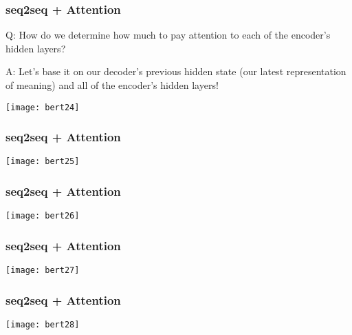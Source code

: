 \begin{frame}[fragile]\frametitle{seq2seq + Attention}

Q: How do we determine how much to pay attention to each of the encoder’s hidden layers? 

A: Let’s base it on our decoder’s previous hidden state (our latest representation of meaning) and all of the encoder’s hidden layers!



\begin{center}
\texttt{[image: bert24]}
\end{center}	

\end{frame}

\begin{frame}[fragile]\frametitle{seq2seq + Attention}

\begin{center}
\texttt{[image: bert25]}
\end{center}	

\end{frame}

\begin{frame}[fragile]\frametitle{seq2seq + Attention}

\begin{center}
\texttt{[image: bert26]}
\end{center}	

\end{frame}

\begin{frame}[fragile]\frametitle{seq2seq + Attention}

\begin{center}
\texttt{[image: bert27]}
\end{center}	

\end{frame}


\begin{frame}[fragile]\frametitle{seq2seq + Attention}

\begin{center}
\texttt{[image: bert28]}
\end{center}	

\end{frame}

